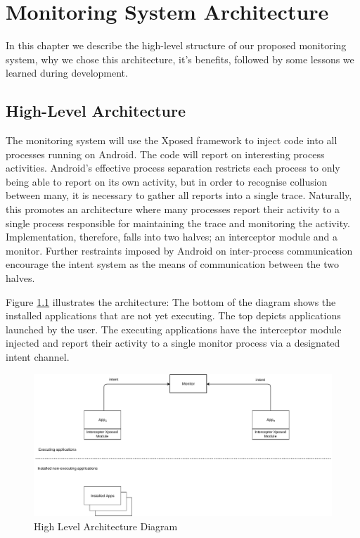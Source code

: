 \chapter{Monitoring System Architecture}
\label{chap:Monitoring System Architecture}

In this chapter we describe the high-level structure of our proposed monitoring system, why we chose this architecture, it's benefits, followed by some lessons we learned during development.

\section{High-Level Architecture}
\label{sec:Architecture}

The monitoring system will use the Xposed framework to inject code into all processes running on Android. The code will report on interesting process activities.  Android's effective process separation restricts each process to only being able to report on its own activity, but in order to recognise collusion between many, it is necessary to gather all reports into a single trace.  Naturally, this promotes an architecture where many processes report their activity to a single process responsible for maintaining the trace and monitoring the activity.  Implementation, therefore, falls into two halves; an interceptor module and a monitor.  Further restraints imposed by Android on inter-process communication encourage the intent system as the means of communication between the two halves.

Figure \ref{fig:highLevelArchitectureDiagram} illustrates the architecture: The bottom of the diagram shows the installed applications that are not yet executing.  The top depicts applications launched by the user.  The executing applications have the interceptor module injected and report their activity to a single monitor process via a designated intent channel.

\begin{figure}[h]
  \centering
  \includegraphics[width=\textwidth]{graphics/HighLevelArchitecture.pdf}
  \caption{High Level Architecture Diagram}
  \label{fig:highLevelArchitectureDiagram}
\end{figure}

